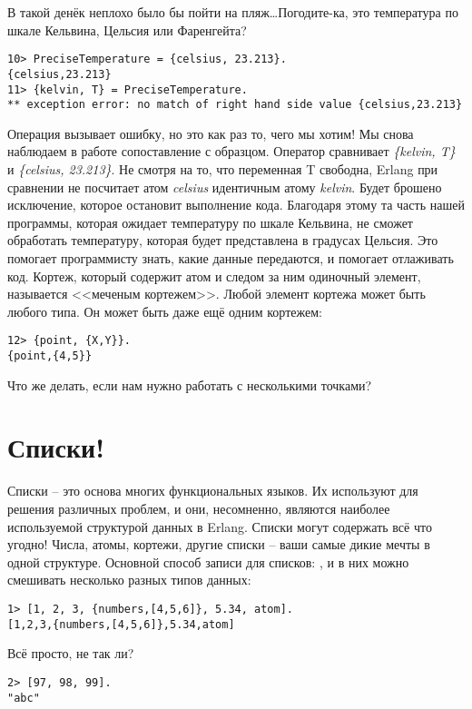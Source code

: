 В такой денёк неплохо было бы пойти на пляж\ldots Погодите\--ка, это температура по шкале Кельвина, Цельсия или Фаренгейта?
\begin{lstlisting}[style=repl]
10> PreciseTemperature = {celsius, 23.213}.
{celsius,23.213}
11> {kelvin, T} = PreciseTemperature.
** exception error: no match of right hand side value {celsius,23.213}
\end{lstlisting}

Операция вызывает ошибку, но это как раз то, чего мы хотим! Мы снова наблюдаем в работе сопоставление с образцом.
Оператор \ops{=} сравнивает \emph{\{kelvin, T\}} и \emph{\{celsius, 23.213\}}.
Не смотря на то, что переменная T свободна, Erlang при сравнении не посчитает атом \emph{celsius} идентичным атому \emph{kelvin}.
Будет брошено исключение, которое остановит выполнение кода.
Благодаря этому та часть нашей программы, которая ожидает температуру по шкале Кельвина, не сможет обработать температуру, которая будет представлена в градусах Цельсия.
Это помогает программисту знать, какие данные передаются, и помогает отлаживать код.
Кортеж, который содержит атом и следом за ним одиночный элемент, называется <<меченым кортежем>>.
Любой элемент кортежа может быть любого типа.
Он может быть даже ещё одним кортежем:
\begin{lstlisting}[style=repl]
12> {point, {X,Y}}.
{point,{4,5}}
\end{lstlisting}

Что же делать, если нам нужно работать с несколькими точками?
\section{Списки!}\label{lists}
Списки \--- это основа многих функциональных языков.
Их используют для решения различных проблем, и они, несомненно, являются наиболее используемой структурой данных в Erlang.
Списки могут содержать всё что угодно!
Числа, атомы, кортежи, другие списки \--- ваши самые дикие мечты в одной структуре.
Основной способ записи для списков: , и в них можно смешивать несколько разных типов данных:
\begin{lstlisting}[style=repl]
1> [1, 2, 3, {numbers,[4,5,6]}, 5.34, atom].
[1,2,3,{numbers,[4,5,6]},5.34,atom]
\end{lstlisting}

Всё просто, не так ли?
\begin{lstlisting}[style=repl]
2> [97, 98, 99].
"abc"
\end{lstlisting}


